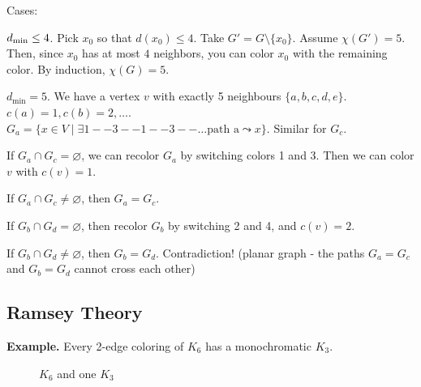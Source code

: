Cases: \\
\begin{compactenum}
  \item $d_{\text{min}} \leq 4$. Pick $x_0$ so that $d(x_0) \leq 4$.
Take $G' = G \setminus \{x_0\}$. Assume $\chi(G')=5$. Then, since $x_0$ has at most $4$ neighbors, you can color $x_0$ with the remaining color. By induction, $\chi(G)=5$.

  \item $d_{\text{min}}=5$.
We have a vertex $v$ with exactly 5 neighbours $\{a,b,c,d,e\}$.
$c(a) = 1, c(b) = 2,\ldots$.
\\
$G_a = \{x\in V\mid \exists 1--3--1--3--\ldots \text{path a} \leadsto x\}$.
Similar for $G_c$.
  \begin{compactenum}
    \item If $G_a\cap G_c =\varnothing$, we can recolor $G_a$ by switching colors 1 and 3. Then we can color $v$ with $c(v) = 1$.

    \item If $G_a\cap G_c ≠ \varnothing$, then $G_a = G_c$.
    \begin{compactenum}
      \item If $G_b\cap G_d =\varnothing$, then recolor $G_b$ by switching 2 and 4, and $c(v) = 2$.
      \item If $G_b\cap G_d ≠\varnothing$, then $G_b = G_d$. Contradiction! (planar graph - the paths $G_a=G_c$ and $G_b=G_d$ cannot cross each other)
    \end{compactenum}
  \end{compactenum}
\end{compactenum}

\subsection*{Ramsey Theory}

\textbf{Example.} Every 2-edge coloring of $K_6$ has a monochromatic $K_3$.

\begin{figure}[htb]
  \centering
  \caption{$K_6$ and one $K_3$}
\end{figure}
\FloatBarrier


